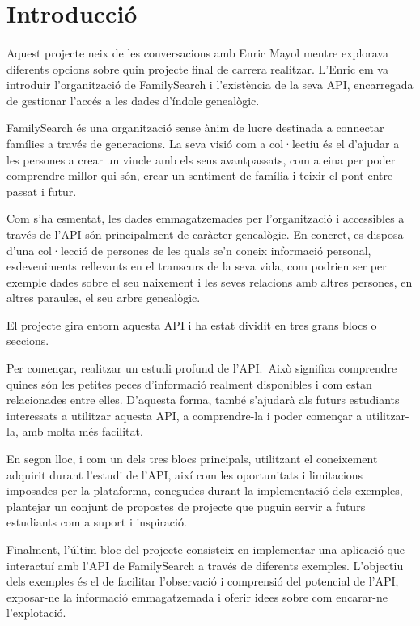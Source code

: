 \section{Introducció}

    \paragraph{}
    Aquest projecte neix de les conversacions amb Enric Mayol mentre explorava diferents opcions sobre quin projecte final de carrera realitzar. L’Enric em va introduir l'organització de FamilySearch i l'existència de la seva \gls{API}, encarregada de gestionar l’accés a les dades d’índole genealògic.

    \gls{FamilySearch} és una organització sense ànim de lucre destinada a connectar famílies a través de generacions. La seva visió com a col·lectiu és el d'ajudar a les persones a crear un vincle amb els seus avantpassats, com a eina per poder comprendre millor qui són, crear un sentiment de família i teixir el pont entre passat i futur.

    Com s'ha esmentat, les dades emmagatzemades per l'organització i accessibles a través de l'\gls{API} són principalment de caràcter genealògic. En concret, es disposa d'una col·lecció de persones de les quals se'n coneix informació personal, esdeveniments rellevants en el transcurs de la seva vida, com podrien ser per exemple dades sobre el seu naixement i les seves relacions amb altres persones, en altres paraules, el seu arbre genealògic.

    El projecte gira entorn aquesta \gls{API} i ha estat dividit en tres grans blocs o seccions.

    Per començar, realitzar un estudi profund de l'\gls{API}.\ Això significa comprendre quines són les petites peces d’informació realment disponibles i com estan relacionades entre elles. D'aquesta forma, també s'ajudarà als futurs estudiants interessats a utilitzar aquesta API, a comprendre-la i poder començar a utilitzar-la, amb molta més facilitat.

    En segon lloc, i com un dels tres blocs principals, utilitzant el coneixement adquirit durant l’estudi de l'\gls{API}, així com les oportunitats i limitacions imposades per la plataforma, conegudes durant la implementació dels exemples, plantejar un conjunt de propostes de projecte que puguin servir a futurs estudiants com a suport i inspiració.

    Finalment, l’últim bloc del projecte consisteix en implementar una aplicació que interactuí amb l'\gls{API} de FamilySearch a través de diferents exemples. L'objectiu dels exemples és el de facilitar l'observació i comprensió del potencial de l'\gls{API}, exposar-ne la informació emmagatzemada i oferir idees sobre com encarar-ne l'explotació.

